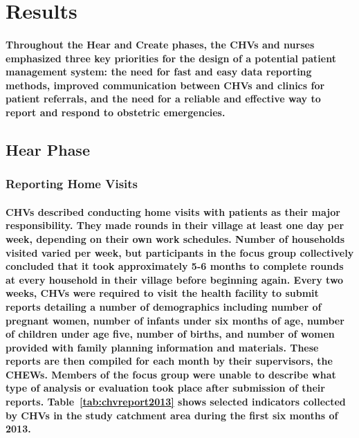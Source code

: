 \section{Results}
\paragraph{Throughout the Hear and Create phases, the CHVs and nurses emphasized three key priorities for the design of a potential patient management system: the need for fast and easy data reporting methods, improved communication between CHVs and clinics for patient referrals, and the need for a reliable and effective way to report and respond to obstetric emergencies.}

\subsection{Hear Phase}
\subsubsection{Reporting Home Visits}
\paragraph{CHVs described conducting home visits with patients as their major responsibility. They made rounds in their village at least one day per week, depending on their own work schedules. Number of households visited varied per week, but participants in the focus group collectively concluded that it took approximately 5-6 months to complete rounds at every household in their village before beginning again. Every two weeks, CHVs were required to visit the health facility to submit reports detailing a number of demographics \textemdash   including number of pregnant women, number of infants under six months of age, number of children under age five, number of births, and number of women provided with family planning information and materials. These reports are then compiled for each month by their supervisors, the CHEWs. Members of the focus group were unable to describe what type of analysis or evaluation took place after submission of their reports. Table~\ref{tab:chvreport2013} shows selected indicators collected by CHVs in the study catchment area during the first six months of 2013. }

